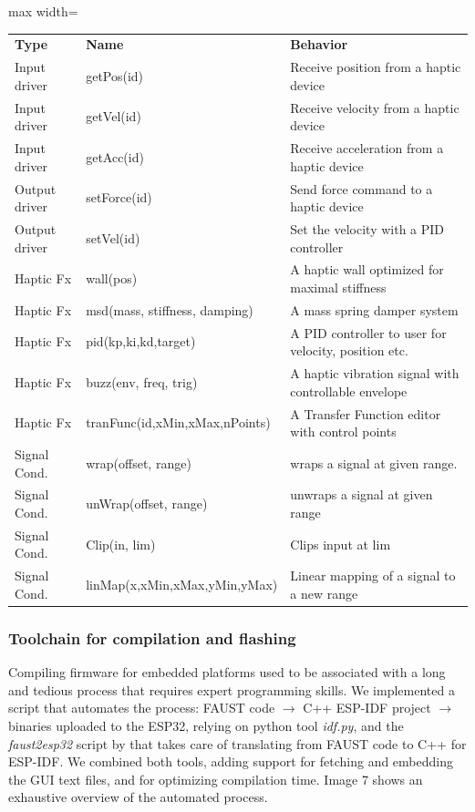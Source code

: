 \documentclass[sigconf]{nimeart}
\begin{document}
\begin{table}[htbp]\centering\small
\begin{adjustbox}{max width=\textwidth}\begin{tabular}{lll}
\toprule
\midrule
\textbf{Type} & \textbf{Name} & \textbf{Behavior} \\
Input driver & getPos(id) & Receive position from a haptic device \\
Input driver & getVel(id) & Receive velocity from a haptic device \\
Input driver & getAcc(id) & Receive acceleration from a haptic device \\
Output driver & setForce(id) & Send force command to a haptic device \\
Output driver & setVel(id) & Set the velocity with a PID controller \\
Haptic Fx & wall(pos) & A haptic wall optimized for maximal stiffness \\
Haptic Fx & msd(mass, stiffness, damping) & A mass spring damper system \\
Haptic Fx & pid(kp,ki,kd,target) & A PID controller to user for velocity, position etc. \\
Haptic Fx & buzz(env, freq, trig) & A haptic vibration signal with controllable envelope \\
Haptic Fx & tranFunc(id,xMin,xMax,nPoints) & A Transfer Function editor with control points \\
Signal Cond. & wrap(offset, range) & wraps a signal at given range. \\
Signal Cond. & unWrap(offset, range) & unwraps a signal at given range \\
Signal Cond. & Clip(in, lim) & Clips input at lim \\
Signal Cond. & linMap(x,xMin,xMax,yMin,yMax) & Linear mapping of a signal to a new range \\
\bottomrule
\end{tabular}\end{adjustbox}\end{table}

\subsubsection{Toolchain for compilation and flashing}\label{toolchain-for-compilation-and-flashing}

Compiling firmware for embedded platforms used to be associated with a long and tedious process that requires expert programming skills. We implemented a script that automates the process: FAUST code $\rightarrow$ C++ ESP-IDF project $\rightarrow$ binaries uploaded to the ESP32, relying on python tool \emph{idf.py}, and the \emph{faust2esp32} script by \cite{Michon2020faust} that takes care of translating from FAUST code to C++ for ESP-IDF. We combined both tools, adding support for fetching and embedding the GUI text files, and for optimizing compilation time. Image 7 shows an exhaustive overview of the automated process.
\end{document}
